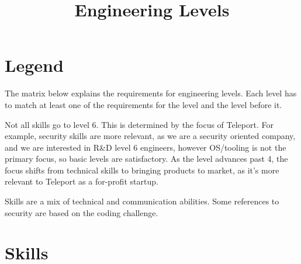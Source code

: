 \documentclass{article}
\begin{document}
\title{Engineering Levels}

\section{Legend}

The matrix below explains the requirements for engineering levels. Each level has to match at least one of the requirements for the level and the level before it.

Not all skills go to level 6. This is determined by the focus of Teleport.
For example, security skills are more relevant, as we are a security oriented company, and we are interested in R\&D level 6 engineers, however OS/tooling is not the primary focus, so basic levels are satisfactory.
As the level advances past 4, the focus shifts from technical skills to bringing products to market, as it's more relevant to Teleport as a for-profit startup.

Skills are a mix of technical and communication abilities. Some references to security are based on the coding challenge.

\section{Skills}
\end{document}
